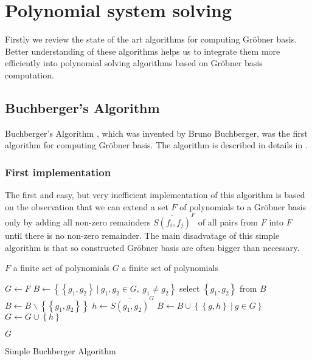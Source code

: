 \chapter{Polynomial system solving}
Firstly we review the state of the art algorithms for computing Gr\"obner basis. Better understanding of these algorithms helps us to integrate them more efficiently into polynomial solving algorithms based on Gr\"obner basis computation.

\section{Buchberger's Algorithm}
Buchberger's Algorithm \cite{Buchberger}, which was invented by Bruno Buchberger, was the first algorithm for computing Gr\"obner basis. The algorithm is described in details in \cite{Cox-Little-Shea97, Becker93}.

\subsection{First implementation}
The first and easy, but very inefficient implementation of this algorithm is based on the observation that we can extend a set $F$ of polynomials to a Gr\"obner basis only by adding all non-zero remainders $\overline{S(f_i, f_j)}^F$ of all pairs from $F$ into $F$ until there is no non-zero remainder. The main disadvatage of this simple algorithm is that so constructed Gr\"obner basis are often bigger than necessary.

\begin{algorithm}[ht]
  \begin{algorithmic}[1]
    \Require
      \Statex $F$ a finite set of polynomials
    \Ensure
      \Statex $G$ a finite set of polynomials
      \Statex

    \State $G \gets F$
    \State $B \gets \left\{\left\{g_1, g_2\right\}\ |\ g_1, g_2 \in G,\ g_1 \neq g_2\right\}$
      \State select $\left\{g_1, g_2\right\}$ from $B$
      \State $B \gets B\backslash\left\{\left\{g_1, g_2\right\}\right\}$
      \State $h \gets \overline{S(g_1, g_2)}^G$
        \State $B \gets B \cup \left\{\left\{g, h\right\}\ |\ g\in G\right\}$
        \State $G \gets G \cup \left\{h\right\}$
      \EndIf
    \EndWhile

    \State \Return $G$

  \end{algorithmic}
  \caption{Simple Buchberger Algorithm}
\end{algorithm}

